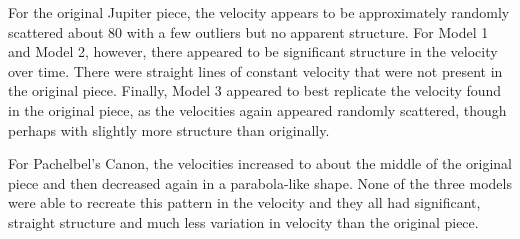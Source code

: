 \documentclass{article} %
\begin{document}
For the original Jupiter piece, the velocity appears to be approximately randomly scattered about 80 with a few outliers but no apparent structure.  For Model 1 and Model 2, however, there appeared to be significant structure in the velocity over time. There were straight lines of constant velocity that were not present in the original piece.  Finally, Model 3 appeared to best replicate the velocity found in the original piece, as the velocities again appeared randomly scattered, though perhaps with slightly more structure than originally.

For Pachelbel's Canon, the velocities increased to about the middle of the original piece and then decreased again in a parabola-like shape.  None of the three models were able to recreate this pattern in the velocity and they all had significant, straight structure and much less variation in velocity than the original piece.
\end{document}

